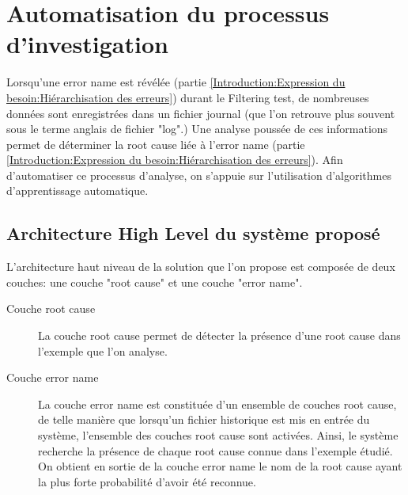 \chapter{Automatisation du processus d'investigation}
\label{Automatisation du processus d'investigation}
\thispagestyle{fancy}
Lorsqu'une error name est révélée (partie \ref{Introduction:Expression du besoin:Hiérarchisation des erreurs}) durant le Filtering test, de nombreuses données sont enregistrées dans un fichier journal (que l'on retrouve plus souvent sous le terme anglais de fichier "log".) Une analyse poussée de ces informations permet de déterminer la root cause liée à l'error name (partie \ref{Introduction:Expression du besoin:Hiérarchisation des erreurs}). Afin d'automatiser ce processus d'analyse, on s'appuie sur l'utilisation d'algorithmes d'apprentissage automatique. 

\section{Architecture High Level du système proposé}
\label{Automatisation du processus d'investigation: Achitecture High Level du système proposé}
L'architecture haut niveau de la solution que l'on propose est composée de deux couches: une couche "root cause" et une couche "error name".
\begin{description}
	\item [Couche root cause] La couche root cause permet de détecter la présence d'une root cause dans l'exemple que l'on analyse.
	\item [Couche error name] La couche error name est constituée d'un ensemble de couches root cause, de telle manière que lorsqu'un fichier historique est mis en entrée du système, l'ensemble des couches root cause sont activées. Ainsi, le système recherche la présence de chaque root cause connue dans l'exemple étudié. On obtient en sortie de la couche error name le nom de la root cause ayant la plus forte probabilité d'avoir été reconnue.
\end{description} 

